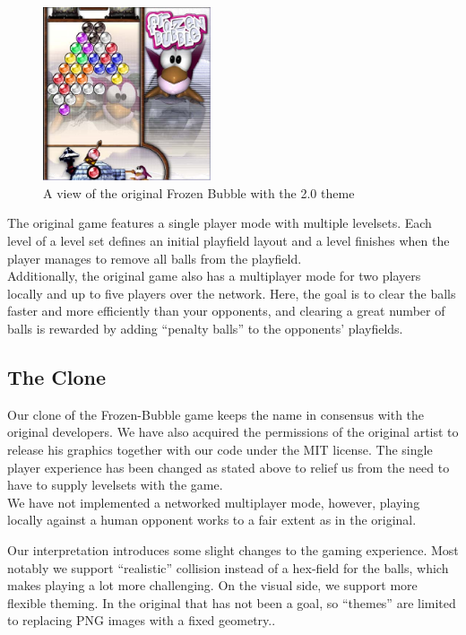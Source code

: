 \begin{figure}
\vspace{-2em}
  \begin{center}
    \includegraphics[width=0.44\textwidth]{images/screenshot1}
  \end{center}
  \vspace{-1em}
  \caption{A view of the original Frozen Bubble with the 2.0 theme}
\vspace{-2em}
\end{figure}

The original game features a single player mode with multiple levelsets. Each level 
of a level set defines an initial playfield layout and
a level finishes when the player manages to remove all balls 
from the playfield.\\
Additionally, the original game also has a multiplayer mode for two players 
locally and up to five players over the network. Here, the goal is to clear the balls 
faster and more efficiently than your opponents, and clearing a great number of balls 
is rewarded by adding ``penalty balls'' to the opponents' playfields.
%
\subsection{The Clone}
Our clone of the Frozen-Bubble game keeps the name in consensus with the original developers.
We have also acquired the permissions of the original artist to release his graphics 
together with our code under the MIT license.
The single player experience has been changed as stated above to relief us from the need 
to have to supply levelsets with the game.\\
We have not implemented a networked multiplayer mode, however, playing locally against 
a human opponent works to a fair extent as in the original.

Our interpretation introduces some slight changes to the gaming experience.
Most notably we support ``realistic'' collision instead of a hex-field for the balls, which
makes playing a lot more challenging. On the visual side, we support more flexible theming.
In the original that has not been a goal, so ``themes'' are limited to replacing PNG images with a fixed geometry..
%
